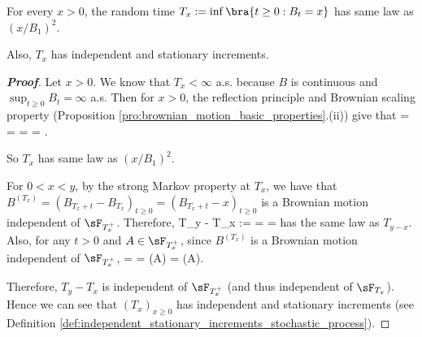 \begin{proposition}\label{pro:stopping_time_brownian_motion_touch_special_point}
For every $x > 0$, the random time $T_x := \inf\bra{t\geq 0:B_t = x}$ has same law as $(x/B_1)^2$.

Also, $T_x$ has independent and stationary increments.%
\end{proposition}

\begin{proof}[\bf Proof]
Let $x>0$. We know that $T_x< \infty$ a.s. because $B$ is continuous and $\sup_{t\geq 0}B_t = \infty$ a.s. Then for $x>0$, the reflection principle and Brownian scaling property (Proposition \ref{pro:brownian_motion_basic_properties}.(ii)) give that
\be
\pro{} = \pro{} = \pro{} = \pro{} = \pro{}.
\ee

So $T_x$ has same law as $(x/B_1)^2$.

For $0<x<y$, by the strong Markov property at $T_x$, we have that $B^{(T_x)} = (B_{T_x+t} -B_{T_x})_{t\geq 0} = (B_{T_x+t} -x)_{t\geq 0}$ is a Brownian motion independent of $\sF_{T_x^+}$. Therefore,
\be
T_y - T_x := \inf{}  = \inf{} = \inf{}
\ee
has the same law as $T_{y-x}$. Also, for any $t>0$ and $A\in \sF_{T_x^+}$, since $B^{(T_x)}$ is a Brownian motion independent of $\sF_{T_x^+}$,
\be
\pro{} = \pro{} = \pro{}\pro(A) = \pro{} \pro(A).
\ee

Therefore, $T_y - T_x$ is independent of $\sF_{T_x^+}$ (and thus independent of $\sF_{T_x}$). Hence we can see that $(T_x)_{x \geq 0}$ has independent and stationary increments (see Definition \ref{def:independent_stationary_increments_stochastic_process}).
\end{proof}


